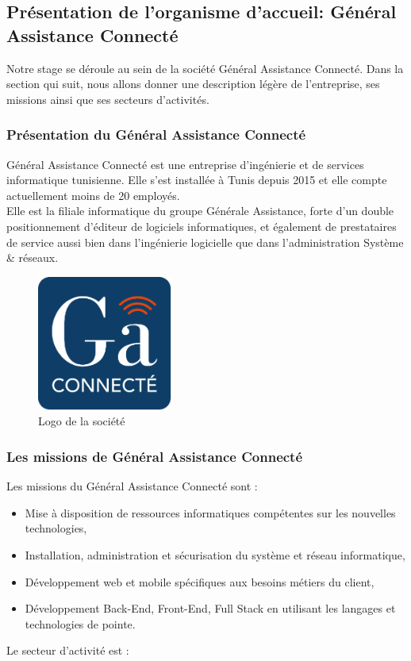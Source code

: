 \documentclass{article}
\begin{document}
\subsection{Présentation de l’organisme d’accueil: Général Assistance Connecté}
Notre stage se déroule au sein de la société Général Assistance Connecté.
Dans la section qui suit, nous allons donner une description légère de l’entreprise, ses missions ainsi que ses secteurs d’activités.  
\subsubsection{Présentation du Général Assistance Connecté }
Général Assistance Connecté est une entreprise d’ingénierie et de services informatique tunisienne. Elle s’est installée à Tunis depuis 2015 et elle compte actuellement moins de 20 employés.\\ Elle est la filiale informatique du groupe Générale Assistance, forte d'un double positionnement d'éditeur de logiciels informatiques, et également de prestataires de service aussi bien dans l'ingénierie logicielle que dans l'administration Système \& réseaux.

\begin{figure}[H]
\centering
\includegraphics[height=1.75in]{gacLogo.png}
\caption[Figure1 : Logo de la société]{Logo de la société}
\label{fig:pic1}
\end{figure}
\subsubsection{Les missions de Général Assistance Connecté }
Les missions du Général Assistance Connecté sont : 
\begin{itemize}
\item Mise à disposition de ressources informatiques compétentes sur les nouvelles technologies,
\item Installation, administration et sécurisation du système et réseau informatique,
\item Développement web et mobile spécifiques aux besoins métiers du client,
\item Développement Back-End, Front-End, Full Stack en utilisant les langages et technologies de pointe.
\end{itemize}
Le secteur d'activité est :
\end{document}
